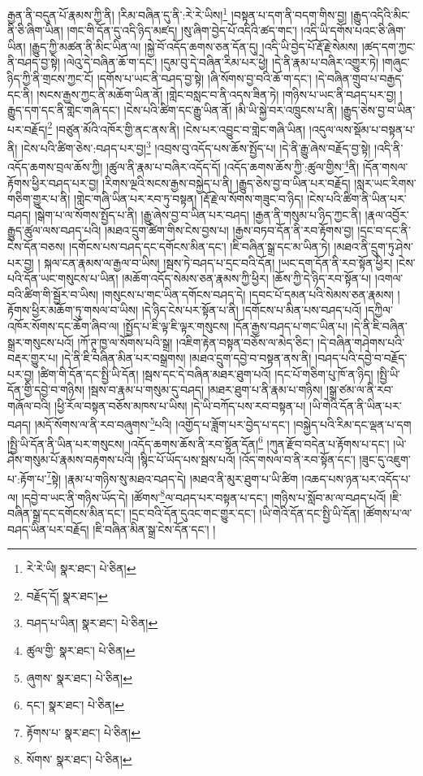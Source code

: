 རྒྱན་ནི་བདུན་པོ་རྣམས་ཀྱི་ནི། །རིམ་བཞིན་དུ་ནི་:རེ་རེ་ཡིས།\footnote{རེ་རེ་ཡི།  སྣར་ཐང་།  པེ་ཅིན། } །བསྟན་པ་དག་ནི་བདག་གིས་བྱ། །རྒྱུད་འདིའི་མིང་ནི་ཅི་ཞིག་ཡིན། །གང་གི་དོན་དུ་འདི་ཉིད་མཛད། །སུ་ཞིག་བྱེད་པོ་འདིའི་ཚད་གང་། །འདི་ཡི་དགོས་པའང་ཅི་ཞིག་ཡིན། །རྒྱུད་ཀྱི་མཚན་ནི་མིང་ཡིན་ལ། །སྐྱེ་བོ་འདོད་ཆགས་ཅན་དོན་དུ། །འདི་ཡི་བྱེད་པོ་རྡོ་རྗེ་སེམས། །ཚད་དག་ཀྱང་ནི་བཤད་བྱ་སྟེ། །ལེའུ་དེ་བཞིན་ཆོ་ག་དང་། །དུམ་བུ་དེ་བཞིན་རིམ་པར་ཕྱེ། །དེ་ནི་རྣམ་པ་བཞིར་འགྱུར་ཏེ། །གཞུང་ཉིད་ཀྱི་ནི་གྲངས་ཀྱང་ངོ། །དགོས་པ་ཡང་ནི་བཤད་བྱ་སྟེ། །ཞི་སོགས་བྱ་བའི་ཆོ་ག་དང་། །དེ་བཞིན་གྲུབ་པ་བརྒྱད་དང་ནི། །སངས་རྒྱས་ཀྱང་ནི་མཆོག་ཡིན་ནོ། །གླེང་བསླང་བ་ནི་འདས་ཟིན་ཏེ། །གཉིས་པ་ཡང་ནི་བཤད་པར་བྱ། །རྒྱུད་དག་དང་ནི་གླེང་གཞི་དང་། །ངེས་པའི་ཚིག་དང་རྒྱུ་ཡིན་ནོ། །མི་ཡི་སྐྱེ་བར་འཁྲུངས་པ་ནི། །རྒྱུད་ཅེས་བྱ་བ་ཡིན་པར་བརྗོད།\footnote{བརྗོད་དོ།  སྣར་ཐང་། } །བཙུན་མོའི་འཁོར་གྱི་ནང་ནས་ནི། །ངེས་པར་འབྱུང་བ་གླེང་གཞི་ཡིན། །འདུལ་ལས་སྡོམ་པ་བསྟན་པ་ནི། །ངེས་པའི་ཚིག་ཅེས་:བཤད་པར་བྱ།\footnote{བཤད་པ་ཡིན།  སྣར་ཐང་།  པེ་ཅིན། } །འབྲས་བུ་འདོད་པས་ཆོས་སྤྱོད་པ། །དེ་ནི་རྒྱུ་ཞེས་བརྗོད་བྱ་སྟེ། །འདི་ནི་འདོད་ཆགས་བྲལ་ཆོས་ཀྱི། །ཚུལ་ནི་རྣམ་པ་བཞིར་འདོད་དོ། །འདོད་ཆགས་ཆོས་ཀྱི་:ཚུལ་གྱིས་\footnote{ཚུལ་གྱི་  སྣར་ཐང་།  པེ་ཅིན། }ནི། །དོན་གསལ་རྟོགས་ཕྱིར་བཤད་པར་བྱ། །རིགས་ལྔའི་སངས་རྒྱས་བསྐྱེད་པ་ནི། །རྒྱུད་ཅེས་བྱ་བ་ཡིན་པར་བརྗོད། །སླར་ཡང་རིགས་གཅིག་གྱུར་པ་ནི། །གླེང་གཞི་ཡིན་པར་རབ་ཏུ་བསྟན། །རྡོ་རྗེ་ལ་སོགས་གཟུང་བ་ཉིད། །ངེས་པའི་ཚིག་ནི་ཡིན་པར་བཤད། །སྒེག་པ་ལ་སོགས་སྤྱོད་པ་ནི། །རྒྱུ་ཞེས་བྱ་བ་ཡིན་པར་བཤད། །རྒྱན་ནི་གསུམ་པ་ཉིད་ཀྱང་ནི། །རྣལ་འབྱོར་རྒྱུད་ཚུལ་ལས་བཤད་པའི། །མཐའ་དྲུག་ཚིག་གིས་ངེས་བྱས་པ། །རྒྱས་བཏབ་དོན་ནི་རབ་རྟོགས་བྱ། །དྲང་བ་དང་ནི་ངེས་དོན་བཅས། །དགོངས་པས་བཤད་དང་དགོངས་མིན་དང་། །ཇི་བཞིན་སྒྲ་དང་མ་ཡིན་ཏེ། །མཐའ་ནི་དྲུག་ཏུ་ཤེས་པར་བྱ། །
སྐལ་ངན་རྣམས་ལ་རྒྱལ་བ་ཡིས། །སྦས་ཏེ་བཤད་པ་དྲང་བའི་དོན། །ཡང་དག་དོན་ནི་རབ་སྟོན་ཕྱིར། །ངེས་པའི་དོན་ཡང་གསུངས་པ་ཡིན། །མཆོག་འདོད་སེམས་ཅན་རྣམས་ཀྱི་ཕྱིར། །ཆོས་ཀྱི་དེ་ཉིད་རབ་སྟོན་པ། །འགལ་བའི་ཚིག་གི་སྦྱོར་བ་ཡིས། །གསུངས་པ་གང་ཡིན་དགོངས་བཤད་དེ། །དབང་པོ་དམན་པའི་སེམས་ཅན་རྣམས། །རྟོགས་ཕྱིར་མཆོག་ཏུ་གསལ་བ་ཡིས། །དེ་ཉིད་ངེས་པར་སྟོན་པ་ནི། །དགོངས་པ་མིན་པས་བཤད་པའོ། །དཀྱིལ་འཁོར་སོགས་དང་ཆོག་ཞིབ་ལ། །སྤྱོད་པ་ཇི་ལྟ་ཇི་ལྟར་གསུངས། །དོན་རྒྱས་བཤད་པ་གང་ཡིན་པ། །དེ་ནི་ཇི་བཞིན་སྒྲར་གསུངས་པའོ། །ཀོ་ཊཱ་ཁྱ་ལ་སོགས་པའི་སྒྲ། །འཇིག་རྟེན་བསྟན་བཅོས་ལ་མེད་ཅིང་། །དེ་བཞིན་གཤེགས་པའི་བརྡར་གྱུར་པ། །དེ་ནི་ཇི་བཞིན་མིན་པར་བསྒྲགས། །མཐའ་དྲུག་དབྱེ་བ་བསྟན་ནས་ནི། །བཤད་པའི་དབྱེ་བ་བརྗོད་པར་བྱ། །ཚིག་གི་དོན་དང་སྤྱི་ཡི་དོན། །སྦས་དང་དེ་བཞིན་མཐར་ཐུག་པའོ། །དང་པོ་གཅིག་པུ་ཁོ་ན་ཉིད། །སྤྱི་ཡི་དོན་གྱི་དབྱེ་བ་གཉིས། །སྦས་བ་རྣམ་པ་གསུམ་དུ་བཤད། །མཐར་ཐུག་པ་ནི་རྣམ་པ་གཉིས། །སྒྲ་ཙམ་ལ་ནི་རབ་གཞོལ་བའི། །ཕྱི་རོལ་བསྟན་བཅོས་མཁས་པ་ཡིས། །དེ་ཡི་བཀོད་པས་རབ་བསྟན་པ། །ཡི་གེའི་དོན་ནི་ཡིན་པར་བཤད། །མདོ་སོགས་ལ་ནི་རབ་བཞུགས་\footnote{ཞུགས་  སྣར་ཐང་།  པེ་ཅིན། }པའི། །འགྱོད་པ་ཟློག་པར་བྱེད་པ་དང་། །བསྐྱེད་པའི་རིམ་དང་ལྡན་པ་དག །སྤྱི་ཡི་དོན་ནི་ཡིན་པར་གསུངས། །འདོད་ཆགས་ཆོས་ནི་རབ་སྟོན་དོན།\footnote{དང་།  སྣར་ཐང་།  པེ་ཅིན། } །ཀུན་རྫོབ་བདེན་པ་རྟོགས་པ་དང་། །ཡེ་ཤེས་གསུམ་པོ་རྣམས་བརྟགས་པའི། །སྙིང་པོ་ཡོད་པས་སྦས་པའོ། །འོད་གསལ་བ་ནི་རབ་སྟོན་དང་། །ཟུང་དུ་འཇུག་པ་:རྟོག་པ་\footnote{རྟོགས་པ་  སྣར་ཐང་།  པེ་ཅིན། }སྟེ། །རྣམ་པ་གཉིས་སུ་མཐའ་བཤད་དེ། །མཐའ་ནི་མུར་ཐུག་པ་ཡི་ཚིག །འཆད་པས་ཉན་པར་འདོད་པ་ལ། །དབྱེ་བ་ཡང་ནི་གཉིས་ཡོད་དེ། །ཚོགས་\footnote{སོགས་  སྣར་ཐང་།  པེ་ཅིན། }ལ་བཤད་པར་བསྟན་པ་དང་། །གཉིས་པ་སློབ་མ་ལ་བཤད་པའོ། །ཇི་བཞིན་སྒྲ་དང་དགོངས་མིན་དང་། །དྲང་བའི་དོན་དུའང་གང་གྱུར་དང་། །ཡི་གེའི་དོན་དང་སྤྱི་ཡི་དོན། །ཚོགས་པ་ལ་བཤད་ཡིན་པར་བརྗོད། །ཇི་བཞིན་མིན་སྒྲ་ངེས་དོན་དང་། །

